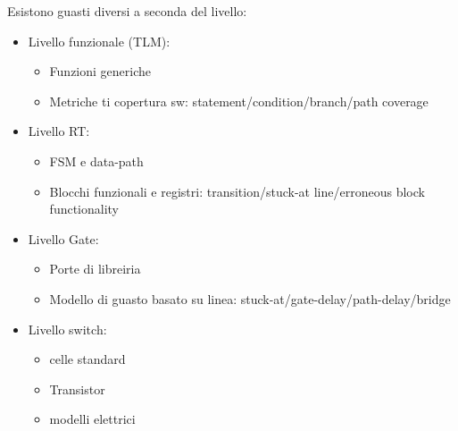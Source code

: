 \documentclass[a4paper]{article}
\theoremstyle{definition}
\begin{document}
			\noindent
			Esistono guasti diversi a seconda del livello:
			\begin{multicols}{2}
				\begin{itemize}
					\item Livello funzionale (TLM):
					\begin{itemize}
						\item Funzioni generiche
						\item Metriche ti copertura sw: statement/condition/branch/path coverage
					\end{itemize}
					\item Livello RT:
					\begin{itemize}
						\item FSM e data-path
						\item Blocchi funzionali e registri: transition/stuck-at line/erroneous block functionality
					\end{itemize}
					\item Livello Gate:
					\begin{itemize}
						\item Porte di libreiria
						\item Modello di guasto basato su linea: stuck-at/gate-delay/path-delay/bridge
					\end{itemize}
					\item Livello switch:
					\begin{itemize}
						\item celle standard
						\item Transistor
						\item modelli elettrici
					\end{itemize}
				\end{itemize}
			\end{multicols}
			
\end{document}
